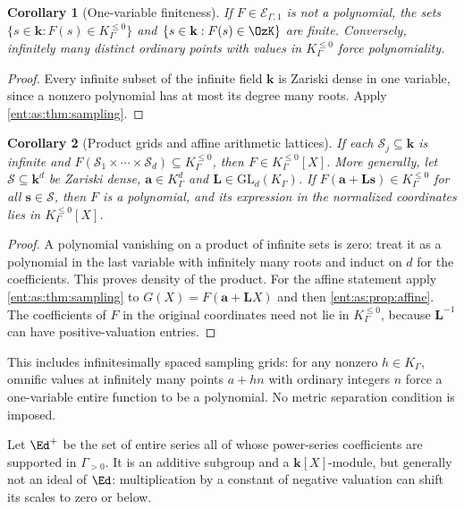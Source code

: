 \documentclass[11pt]{article}
\theoremstyle{plain}
\theoremstyle{plain}
\theoremstyle{plain}
\newtheorem{corollary}[corollary]{Corollary}
\theoremstyle{definition}
\theoremstyle{definition}
\theoremstyle{definition}
\theoremstyle{definition}
\theoremstyle{remark}
\newcommand{\K}{K_\Gamma}\newcommand{\KD}{K_\Delta}
\newcommand{\kk}{\mathbf k}\newcommand{\PP}{\mathbb P}
\newcommand{\Kle}{K_\Gamma^{\le0}}\DeclareMathOperator{\Jac}{Jac}
\begin{document}
\begin{corollary}[One-variable finiteness]\label{ent:as:cor:finite-points}
If $F\in\mathcal E_{\Gamma,1}$ is not a polynomial, the sets
$\{s\in\kk:F(s)\in\Kle\}$ and $\{s\in\kk:F(s)\in\OzK\}$ are finite.
Conversely, infinitely many distinct ordinary points with values in $\Kle$
force polynomiality.
\end{corollary}
\begin{proof}
Every infinite subset of the infinite field $\kk$ is Zariski dense in one
variable, since a nonzero polynomial has at most its degree many roots. Apply
\cref{ent:as:thm:sampling}.
\end{proof}

\begin{corollary}[Product grids and affine arithmetic lattices]
\label{ent:as:cor:affine-sampling}
If each $\mathcal S_j\subseteq\kk$ is infinite and
$F(\mathcal S_1\times\cdots\times\mathcal S_d)\subseteq\Kle$, then
$F\in\Kle[X]$. More generally, let $\mathcal S\subseteq\kk^d$ be Zariski dense,
$\mathbf a\in\K^d$ and $\mathbf L\in\mathrm{GL}_d(\K)$. If
$F(\mathbf a+\mathbf L\mathbf s)\in\Kle$ for all $\mathbf s\in\mathcal S$, then
$F$ is a polynomial, and its expression in the normalized coordinates lies in
$\Kle[X]$.
\end{corollary}
\begin{proof}
A polynomial vanishing on a product of infinite sets is zero: treat it as a
polynomial in the last variable with infinitely many roots and induct on $d$
for the coefficients. This proves density of the product. For the affine
statement apply \cref{ent:as:thm:sampling} to $G(X)=F(\mathbf a+\mathbf LX)$
and then \cref{ent:as:prop:affine}. The coefficients of $F$ in the original
coordinates need not lie in $\Kle$, because $\mathbf L^{-1}$ can have
positive-valuation entries.
\end{proof}

This includes infinitesimally spaced sampling grids: for any nonzero
$h\in\K$, omnific values at infinitely many points $a+hn$ with ordinary
integers $n$ force a one-variable entire function to be a polynomial. No
metric separation condition is imposed.

Let $\Ed^{+}$ be the set of entire series all of whose power-series
coefficients are supported in $\Gamma_{>0}$. It is an additive subgroup and a
$\kk[X]$-module, but generally not an ideal of $\Ed$: multiplication by a
constant of negative valuation can shift its scales to zero or below.
\end{document}
